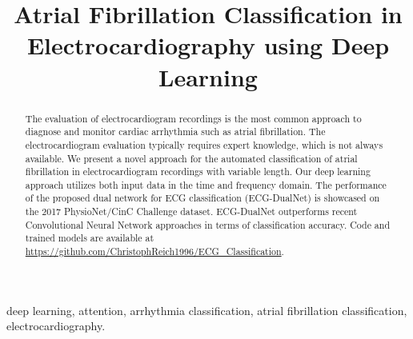 \documentclass[conference]{IEEEtran}
\begin{document}
\title{Atrial Fibrillation Classification in Electrocardiography using Deep Learning}

\author{ 
\vspace{0.05in}
}

    \maketitle
    
    \begin{abstract}
    The evaluation of electrocardiogram recordings is the most common approach to diagnose and monitor cardiac arrhythmia such as atrial fibrillation. The electrocardiogram evaluation typically requires expert knowledge, which is not always available. We present a novel approach for the automated classification of atrial fibrillation in electrocardiogram recordings with variable length. Our deep learning approach utilizes both input data in the time and frequency domain. The performance of the proposed dual network for ECG classification (ECG-DualNet) is showcased on the 2017 PhysioNet/CinC Challenge dataset. ECG-DualNet outperforms recent Convolutional Neural Network approaches in terms of classification accuracy. Code and trained models are available at \url{https://github.com/ChristophReich1996/ECG_Classification}.
    \end{abstract}
    
    \begin{IEEEkeywords}
    deep learning, attention, arrhythmia classification, atrial fibrillation classification, electrocardiography.
    \end{IEEEkeywords}
    
    
    
    
    
    
    
    
    
    
    
    
    
\end{document}

